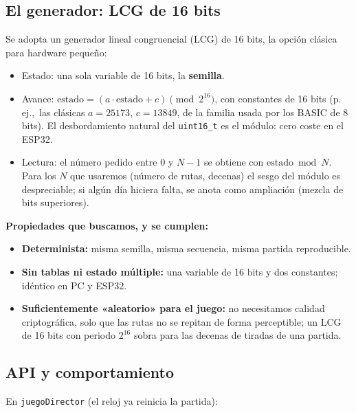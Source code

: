 \subsection{El generador: LCG de 16 bits}

Se adopta un generador lineal congruencial (LCG) de 16 bits, la opción
clásica para hardware pequeño:

\begin{itemize}
	\item Estado: una sola variable de 16 bits, la \textbf{semilla}.
	
	\item Avance: $\text{estado} = (a \cdot \text{estado} + c) \pmod{2^{16}}$,
	con constantes de 16 bits (p.\,ej.,\ las clásicas $a = 25173$,
	$c = 13849$, de la familia usada por los BASIC de 8 bits). El
	desbordamiento natural del \texttt{uint16\_t} es el módulo: cero
	coste en el ESP32.
	
	\item Lectura: el número pedido entre 0 y $N-1$ se obtiene con
	$\text{estado} \bmod N$. Para los $N$ que usaremos (número de rutas,
	decenas) el sesgo del módulo es despreciable; si algún día hiciera
	falta, se anota como ampliación (mezcla de bits superiores).
\end{itemize}

\textbf{Propiedades que buscamos, y se cumplen:}

\begin{itemize}
	\item \textbf{Determinista:} misma semilla, misma secuencia, misma partida
	reproducible.
	
	\item \textbf{Sin tablas ni estado múltiple:} una variable de 16 bits y dos
	constantes; idéntico en PC y ESP32.
	
	\item \textbf{Suficientemente «aleatorio» para el juego:} no necesitamos
	calidad criptográfica, solo que las rutas no se repitan de forma
	perceptible; un LCG de 16 bits con periodo $2^{16}$ sobra para las
	decenas de tiradas de una partida.
\end{itemize}

\subsection{API y comportamiento}

En \texttt{juegoDirector} (el reloj ya reinicia la partida):

